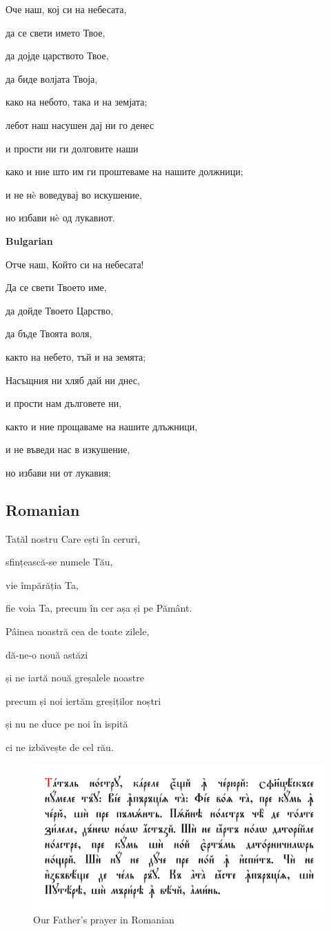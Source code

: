 Оче наш, кој си на небесата,

да се свети името Твое,

да дојде царството Твое,

да биде волјата Твоја,

како на небото, така и на земјата;

лебот наш насушен дај ни го денес

и прости ни ги долговите наши

како и ние што им ги проштеваме на нашите должници;

и не нè воведувај во искушение,

но избави нè од лукавиот.

\textbf{Bulgarian}

Отче наш, Който си на небесата!

Да се свети Твоето име,

да дойде Твоето Царство,

да бъде Твоята воля,

както на небето, тъй и на земята;

Насъщния ни хляб дай ни днес,

и прости нам дълговете ни,

както и ние прощаваме на нашите длъжници,

и не въведи нас в изкушение,

но избави ни от лукавия;

\subsection{Romanian}

Tatăl nostru Care ești în ceruri,

sfințească-se numele Tău,

vie împărăția Ta,

fie voia Ta, precum în cer așa și pe Pământ.

Pâinea noastră cea de toate zilele,

dă-ne-o nouă astăzi

și ne iartă nouă greșalele noastre

precum și noi iertăm greșiților noștri

și nu ne duce pe noi în ispită

ci ne izbăvește de cel rău.

\begin{figure}
	\includegraphics[width=\linewidth]{./sources/of-romanian.png}
	\caption{Our Father's prayer in Romanian}
	\label{fig:of-romanian}
\end{figure}

